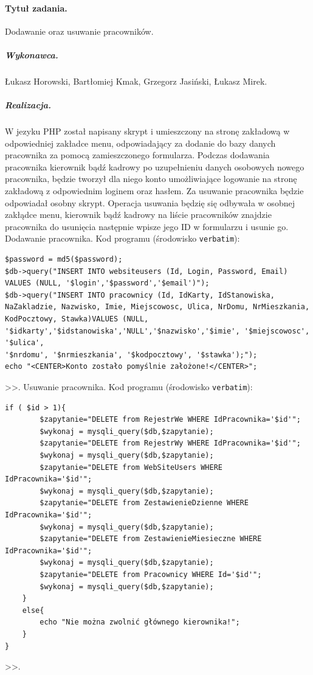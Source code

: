 \documentclass[a4paper]{article}
\begin{document}
\paragraph{Tytuł zadania.} Dodawanie oraz usuwanie pracowników.
\subparagraph{Wykonawca.} Łukasz Horowski, Bartłomiej Kmak, Grzegorz Jasiński, Łukasz Mirek.
\subparagraph{Realizacja.} W jezyku PHP został napisany skrypt i umieszczony na stronę zakładową w odpowiedniej zakładce menu, odpowiadający za dodanie do bazy danych pracownika za pomocą zamieszczonego formularza. Podczas dodawania pracownika kierownik bądź kadrowy po uzupełnieniu danych osobowych nowego pracownika, będzie tworzył dla niego konto umożliwiające logowanie na stronę zakładową z odpowiednim loginem oraz hasłem. Za usuwanie pracownika będzie odpowiadał osobny skrypt. Operacja usuwania będzię się odbywała w osobnej zakłądce menu, kierownik bądź kadrowy na liście pracowników znajdzie pracownika do usunięcia następnie wpisze jego ID w formularzu i usunie go.
Dodawanie pracownika.
Kod programu (środowisko \texttt{verbatim}): 
\begin{verbatim}
$password = md5($password);
$db->query("INSERT INTO websiteusers (Id, Login, Password, Email) VALUES (NULL, '$login','$password','$email')");
$db->query("INSERT INTO pracownicy (Id, IdKarty, IdStanowiska, NaZakladzie, Nazwisko, Imie, Miejscowosc, Ulica, NrDomu, NrMieszkania, KodPocztowy, Stawka)VALUES (NULL, '$idkarty','$idstanowiska','NULL','$nazwisko','$imie', '$miejscowosc', '$ulica',
'$nrdomu', '$nrmieszkania', '$kodpocztowy', '$stawka');");
echo "<CENTER>Konto zostało pomyślnie założone!</CENTER>";
\end{verbatim}>>.
Usuwanie pracownika.
Kod programu (środowisko \texttt{verbatim}): 
\begin{verbatim}
if ( $id > 1){ 
		$zapytanie="DELETE from RejestrWe WHERE IdPracownika='$id'"; 
		$wykonaj = mysqli_query($db,$zapytanie);
		$zapytanie="DELETE from RejestrWy WHERE IdPracownika='$id'"; 
		$wykonaj = mysqli_query($db,$zapytanie);
		$zapytanie="DELETE from WebSiteUsers WHERE IdPracownika='$id'"; 
		$wykonaj = mysqli_query($db,$zapytanie);
		$zapytanie="DELETE from ZestawienieDzienne WHERE IdPracownika='$id'"; 
		$wykonaj = mysqli_query($db,$zapytanie);
		$zapytanie="DELETE from ZestawienieMiesieczne WHERE IdPracownika='$id'"; 
		$wykonaj = mysqli_query($db,$zapytanie);
		$zapytanie="DELETE from Pracownicy WHERE Id='$id'"; 
		$wykonaj = mysqli_query($db,$zapytanie);
	}
	else{
		echo "Nie można zwolnić głównego kierownika!";
	}
}
\end{verbatim}>>.
\end{document}
